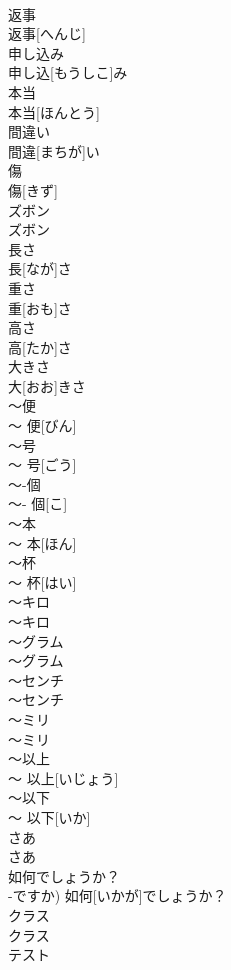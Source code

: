 \documentclass[8pt]{extreport}
\begin{document}
\begin{CJK}{UTF8}{min}
\\	返事	
\\	返事[へんじ]	
\\	申し込み	
\\	申し込[もうしこ]み	
\\	本当	
\\	本当[ほんとう]	
\\	間違い	
\\	間違[まちが]い	
\\	傷	
\\	傷[きず]	
\\	ズボン	
\\	ズボン	
\\	長さ	
\\	長[なが]さ	
\\	重さ	
\\	重[おも]さ	
\\	高さ	
\\	高[たか]さ	
\\	大きさ	
\\	大[おお]きさ	
\\	〜便	
\\	〜 便[びん]	
\\	〜号	
\\	〜 号[ごう]	
\\	〜-個	
\\	〜- 個[こ]	
\\	〜本	
\\	〜 本[ほん]	
\\	〜杯	
\\	〜 杯[はい]	
\\	〜キロ	
\\	〜キロ	
\\	〜グラム	
\\	〜グラム	
\\	〜センチ	
\\	〜センチ	
\\	〜ミリ	
\\	〜ミリ	
\\	〜以上	
\\	〜 以上[いじょう]	
\\	〜以下	
\\	〜 以下[いか]	
\\	さあ	
\\	さあ	
\\	如何でしょうか？	
\\	-ですか)	如何[いかが]でしょうか？	
\\	クラス	
\\	クラス	
\\	テスト	

\end{CJK}
\end{document}
